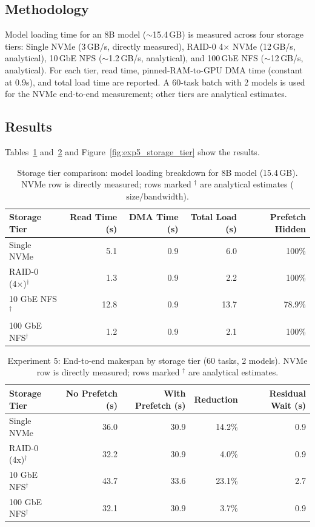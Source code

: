 \documentclass[logo,bsc,singlespacing,parskip,online]{infthesis}
\begin{document}
\subsection{Methodology}

Model loading time for an 8B model ($\sim$15.4\,GB) is measured across four storage tiers: Single NVMe (3\,GB/s, directly measured), RAID-0 4$\times$ NVMe (12\,GB/s, analytical), 10\,GbE NFS ($\sim$1.2\,GB/s, analytical), and 100\,GbE NFS ($\sim$12\,GB/s, analytical). For each tier, read time, pinned-RAM-to-GPU DMA time (constant at 0.9s), and total load time are reported. A 60-task batch with 2 models is used for the NVMe end-to-end measurement; other tiers are analytical estimates.

\subsection{Results}

Tables~\ref{tab:exp5_storage_results} and~\ref{tab:exp5_makespan_results} and Figure~\ref{fig:exp5_storage_tier} show the results.

\begin{table}[htbp]
\centering
\caption{Storage tier comparison: model loading breakdown for 8B model (15.4\,GB). NVMe row is directly measured; rows marked $^\dagger$ are analytical estimates ($\text{size}/\text{bandwidth}$).}
\label{tab:exp5_storage_results}
\begin{tabular}{lrrrr}
\toprule
Storage Tier & Read Time (s) & DMA Time (s) & Total Load (s) & Prefetch Hidden \\
\midrule
Single NVMe & 5.1 & 0.9 & 6.0 & 100\% \\
RAID-0 (4×)$^\dagger$ & 1.3 & 0.9 & 2.2 & 100\% \\
10 GbE NFS$^\dagger$ & 12.8 & 0.9 & 13.7 & 78.9\% \\
100 GbE NFS$^\dagger$ & 1.2 & 0.9 & 2.1 & 100\% \\
\bottomrule
\end{tabular}
\end{table}


\begin{table}[htbp]
\centering
\caption{Experiment 5: End-to-end makespan by storage tier (60 tasks, 2 models). NVMe row is directly measured; rows marked $^\dagger$ are analytical estimates.}
\label{tab:exp5_makespan_results}
\begin{tabular}{lrrrr}
\toprule
Storage Tier & No Prefetch (s) & With Prefetch (s) & Reduction & Residual Wait (s) \\
\midrule
Single NVMe & 36.0 & 30.9 & 14.2\% & 0.9 \\
RAID-0 (4x)$^\dagger$ & 32.2 & 30.9 & 4.0\% & 0.9 \\
10 GbE NFS$^\dagger$ & 43.7 & 33.6 & 23.1\% & 2.7 \\
100 GbE NFS$^\dagger$ & 32.1 & 30.9 & 3.7\% & 0.9 \\
\bottomrule
\end{tabular}
\end{table}
\end{document}
